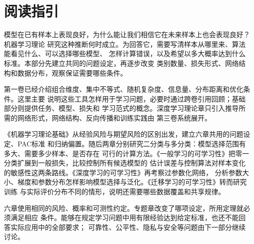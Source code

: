 \chapter*{阅读指引}

模型在已有样本上表现良好，为什么能让我们相信它在未来样本上也会表现良好？机器学习理论
研究这种推断何时成立。为回答它，需要写清样本从哪里来、算法能看见什么、可以选择哪些模型、
怎样计算错误，以及希望以多大概率达到什么标准。本部分先建立共同的问题设定，再逐步改变
类别数量、损失形式、网络结构和数据分布，观察保证需要哪些条件。

第一卷已经介绍组合维度、集中不等式、随机复杂度、信息量、分布距离和优化条件。这里主要
说明这些工具怎样用于学习问题，必要时通过跨卷引用回顾；基础部分则提供任务、模型、损失和
学习范式的概念。深度学习理论章只引入推导所需的网络形式，网络结构、反向传播和训练实践由
第三卷系统展开。

《机器学习理论基础》从经验风险与期望风险的区别出发，建立六章共用的问题设定、PAC标准
和归纳偏置。随后两章分别研究二分类与多分类：模型选择范围有多大、需要多少样本、是否存在
可行的计算方法。《一般学习的可学习性》把零一分类扩展到一般损失，比较控制所有候选模型的
估计误差与控制算法对样本变化的敏感性这两条路线。《深度学习的可学习性》再考察过参数化网络，
分析参数大小、梯度和参数分布怎样影响模型选择与泛化。《迁移学习的可学习性》转而研究训练
与实际评价分布不同的情形，说明还需要哪些数据覆盖和共享规律。

六章使用相同的风险、概率和可测性约定。专题章改变了哪项设定，所用定理就必须满足相应
条件。能够在规定学习问题中用有限经验达到给定标准，也还不能回答实际应用中的全部要求；
可靠性、公平性、隐私与安全等问题由下一部分继续讨论。
